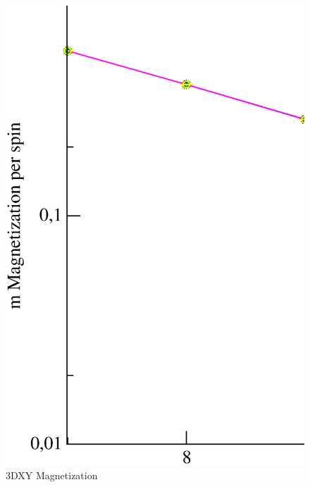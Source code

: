 \begin{figure}[!htpb]
  \centering
  \includegraphics[width=\textwidth]{./plots/3DXY/vsL/Magnetization.eps}
  \caption{3DXY Magnetization}
\end{figure}

